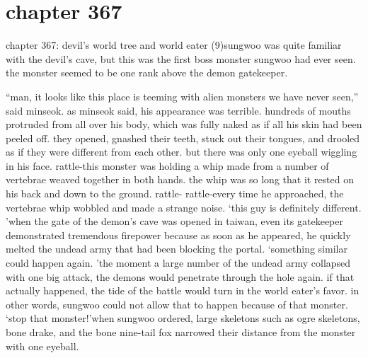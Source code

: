 \section{chapter 367}

chapter 367: devil’s world tree and world eater (9)sungwoo was quite familiar with the devil’s cave, but this was the first boss monster sungwoo had ever seen.
 the monster seemed to be one rank above the demon gatekeeper.





“man, it looks like this place is teeming with alien monsters we have never seen,” said minseok.
as minseok said, his appearance was terrible.
 hundreds of mouths protruded from all over his body, which was fully naked as if all his skin had been peeled off.
 they opened, gnashed their teeth, stuck out their tongues, and drooled as if they were different from each other.
 but there was only one eyeball wiggling in his face.
rattle-this monster was holding a whip made from a number of vertebrae weaved together in both hands.
 the whip was so long that it rested on his back and down to the ground.
rattle- rattle-every time he approached, the vertebrae whip wobbled and made a strange noise.
‘this guy is definitely different.
’when the gate of the demon’s cave was opened in taiwan, even its gatekeeper demonstrated tremendous firepower because as soon as he appeared, he quickly melted the undead army that had been blocking the portal.
‘something similar could happen again.
’the moment a large number of the undead army collapsed with one big attack, the demons would penetrate through the hole again.
if that actually happened, the tide of the battle would turn in the world eater’s favor.
in other words, sungwoo could not allow that to happen because of that monster.
‘stop that monster!’when sungwoo ordered, large skeletons such as ogre skeletons, bone drake, and the bone nine-tail fox narrowed their distance from the monster with one eyeball.

